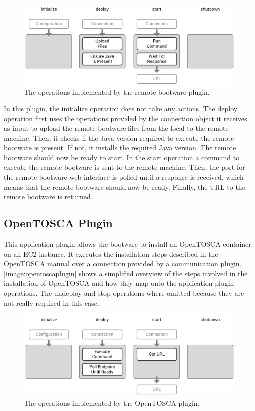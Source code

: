 \begin{figure}[!htbp]
	\centering
	\includegraphics[resolution=600]{implementation/assets/remotebootware_plugin}
	\caption{The operations implemented by the remote bootware plugin.}
	\label{image:remotebootwareplugin}
\end{figure}

In this plugin, the initialize operation does not take any actions.
The deploy operation first uses the operations provided by the connection object it receives as input to upload the remote bootware files from the local to the remote machine.
Then, it checks if the Java version required to execute the remote bootware is present.
If not, it installs the required Java version.
The remote bootware should now be ready to start.
In the start operation a command to execute the remote bootware is sent to the remote machine.
Then, the port for the remote bootware web interface is polled until a response is received, which means that the remote bootware should now be ready.
Finally, the URL to the remote bootware is returned.

\subsection{OpenTOSCA Plugin}

This application plugin allows the bootware to install an OpenTOSCA container on an EC2 instance.
It executes the installation steps described in the OpenTOSCA manual over a connection provided by a communication plugin.
\autoref{image:opentoscaplugin} shows a simplified overview of the steps involved in the installation of OpenTOSCA and how they map onto the application plugin operations.
The undeploy and stop operations where omitted because they are not really required in this case.

\begin{figure}[!htbp]
	\centering
	\includegraphics[resolution=600]{implementation/assets/opentosca_plugin}
	\caption{The operations implemented by the OpenTOSCA plugin.}
	\label{image:opentoscaplugin}
\end{figure}

